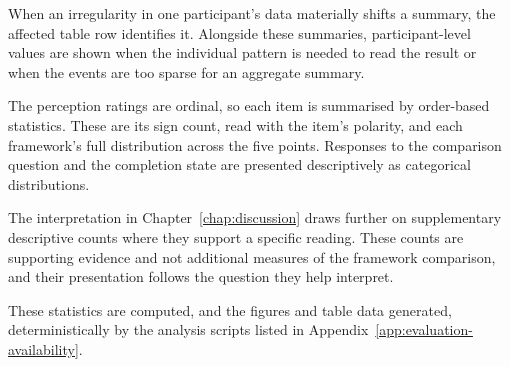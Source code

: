 When an irregularity in one participant's data materially shifts a summary, the affected table row identifies it. Alongside these summaries, participant-level values are shown when the individual pattern is needed to read the result or when the events are too sparse for an aggregate summary.

The perception ratings are ordinal, so each item is summarised by order-based statistics. These are its sign count, read with the item's polarity, and each framework's full distribution across the five points. Responses to the comparison question and the completion state are presented descriptively as categorical distributions.

The interpretation in Chapter~\ref{chap:discussion} draws further on supplementary descriptive counts where they support a specific reading. These counts are supporting evidence and not additional measures of the framework comparison, and their presentation follows the question they help interpret.

These statistics are computed, and the figures and table data generated, deterministically by the analysis scripts listed in Appendix~\ref{app:evaluation-availability}.
